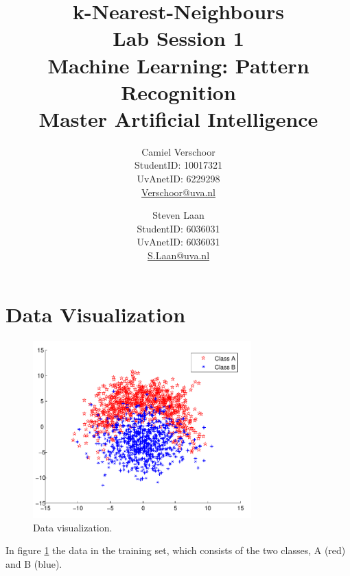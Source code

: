 \documentclass[a4paper]{article}
\title{k-Nearest-Neighbours\\\large Lab Session 1\\Machine Learning: Pattern Recognition\\Master Artificial Intelligence}
\author{Camiel Verschoor \\StudentID: 10017321\\UvAnetID: 6229298\\ \url{Verschoor@uva.nl} \and Steven Laan\\StudentID: 6036031\\UvAnetID: 6036031\\\url{S.Laan@uva.nl}}
\begin{document}
\maketitle

\section{Data Visualization}
\begin{figure}[!ht]
\centering
\includegraphics[width=0.75\textwidth]{images/data_scatterplot.pdf}
\caption{Data visualization.}
\label{data}
\end{figure}
In figure \ref{data} the data in the training set, which consists of the two classes, A (red) and B (blue).

\newpage
\end{document}
